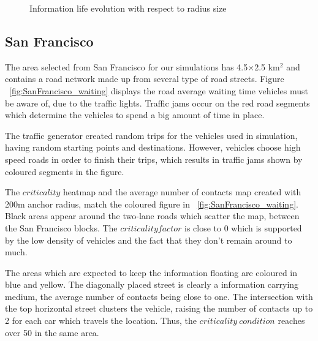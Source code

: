  \begin{figure}[h]
	\centering
	\def\svgwidth{\columnwidth}
	
	\caption{Information life evolution with respect to radius size}
 	\label{fig:Beijing_info_evolution_range}
 \end{figure}
 
\subsection{San Francisco}

The area selected from San Francisco for our simulations has 4.5$\times$2.5
km$^2$ and contains a road network made up from several type of road streets.
Figure ~\ref{fig:SanFrancisco_waiting} displays the road average waiting time
vehicles must be aware of, due to the traffic lights. Traffic jams occur on the
red road segments which determine the vehicles to spend a big amount of time in
place.

The traffic generator created random trips for the vehicles used in simulation,
having random starting points and destinations. However, vehicles choose high
speed roads in order to finish their trips, which results in traffic jams shown
by coloured segments in the figure.

The $criticality$ heatmap and the average number of contacts map created
with 200m anchor radius, match the coloured figure in
~\ref{fig:SanFrancisco_waiting}. Black areas appear around the two-lane roads
which scatter the map, between the San Francisco blocks. The $criticality
factor$ is close to 0 which is supported by the low density of vehicles and
the fact that they don't remain around to much.

The areas which are expected to keep the information floating are coloured in
blue and yellow. The diagonally placed street is clearly a information carrying
medium, the average number of contacts being close to one. The intersection with
the top horizontal street clusters the vehicle, raising the number of contacts
up to 2 for each car which travels the location. Thus, the $criticality\
condition$ reaches over 50 in the same area.

